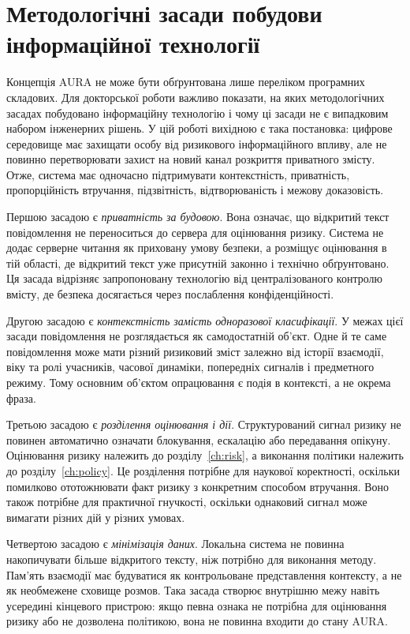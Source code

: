 \section{Методологічні засади побудови інформаційної технології}
\label{sec:methodological-principles}

Концепція AURA не може бути обґрунтована лише переліком програмних складових. Для докторської роботи важливо показати, на яких методологічних засадах побудовано інформаційну технологію і чому ці засади не є випадковим набором інженерних рішень. У цій роботі вихідною є така постановка: цифрове середовище має захищати особу від ризикового інформаційного впливу, але не повинно перетворювати захист на новий канал розкриття приватного змісту. Отже, система має одночасно підтримувати контекстність, приватність, пропорційність втручання, підзвітність, відтворюваність і межову доказовість.

Першою засадою є \emph{приватність за будовою}. Вона означає, що відкритий текст повідомлення не переноситься до сервера для оцінювання ризику. Система не додає серверне читання як приховану умову безпеки, а розміщує оцінювання в тій області, де відкритий текст уже присутній законно і технічно обґрунтовано. Ця засада відрізняє запропоновану технологію від централізованого контролю вмісту, де безпека досягається через послаблення конфіденційності.

Другою засадою є \emph{контекстність замість одноразової класифікації}. У межах цієї засади повідомлення не розглядається як самодостатній об'єкт. Одне й те саме повідомлення може мати різний ризиковий зміст залежно від історії взаємодії, віку та ролі учасників, часової динаміки, попередніх сигналів і предметного режиму. Тому основним об'єктом опрацювання є подія в контексті, а не окрема фраза.

Третьою засадою є \emph{розділення оцінювання і дії}. Структурований сигнал ризику не повинен автоматично означати блокування, ескалацію або передавання опікуну. Оцінювання ризику належить до розділу~\ref{ch:risk}, а виконання політики належить до розділу~\ref{ch:policy}. Це розділення потрібне для наукової коректності, оскільки помилково ототожнювати факт ризику з конкретним способом втручання. Воно також потрібне для практичної гнучкості, оскільки однаковий сигнал може вимагати різних дій у різних умовах.

Четвертою засадою є \emph{мінімізація даних}. Локальна система не повинна накопичувати більше відкритого тексту, ніж потрібно для виконання методу. Пам'ять взаємодії має будуватися як контрольоване представлення контексту, а не як необмежене сховище розмов. Така засада створює внутрішню межу навіть усередині кінцевого пристрою: якщо певна ознака не потрібна для оцінювання ризику або не дозволена політикою, вона не повинна входити до стану AURA.


